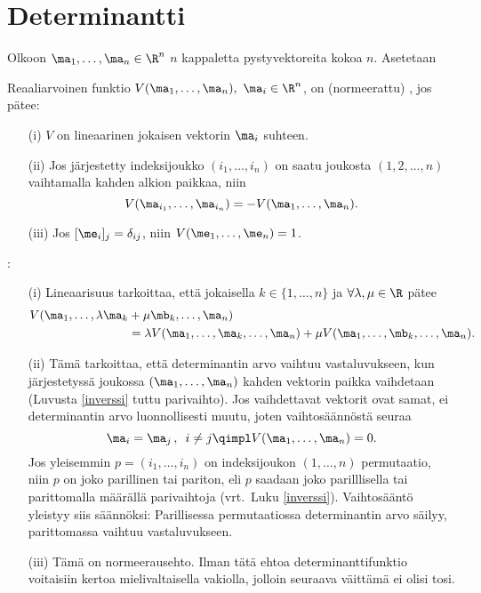 \section{Determinantti} \label{determinantti} 
\alku
{}

Olkoon $\ma_1,\ldots,\ma_n\in\R^n$ $n$ kappaletta pystyvektoreita kokoa $n$. Asetetaan
\begin{Def} \label{determinantin määritelmä} 
Reaaliarvoinen funktio $V(\ma_1,\ldots,\ma_n), \ \ma_i\in\R^n$, on (normeerattu)
, jos pätee:
\begin{itemize}
\item[(i)]   $V$ on lineaarinen jokaisen vektorin $\ma_i$ suhteen.
\item[(ii)]  Jos järjestetty indeksijoukko $(i_1,\ldots,i_n)$ on saatu joukosta $(1,2,\ldots,n)$
             vaihtamalla kahden alkion paikkaa, niin
             \[
             V(\ma_{i_1},\ldots,\ma_{i_n})=-V(\ma_1,\ldots,\ma_n).
             \]
\item[(iii)] Jos $[\me_i]_j=\delta_{ij}$, niin $V(\me_1,\ldots,\me_n)=1$.
\end{itemize}
\end{Def}
:
\begin{itemize}
\item[(i)]   Lineaarisuus tarkoittaa, että jokaisella 
             $k\in\{1,\ldots,n\}$ ja $\forall\lambda,\mu\in\R$ pätee
             \begin{align*}
             V(\ma_1,\ldots,\lambda\ma_k &+ \mu\mb_k,\ldots,\ma_n)\\
             &=\lambda V(\ma_1,\ldots,\ma_k,\ldots,\ma_n)
              +\mu V(\ma_1,\ldots,\mb_k,\ldots,\ma_n).
             \end{align*}
\item[(ii)]  %
             Tämä  tarkoittaa, että determinantin arvo vaihtuu vastaluvukseen,
             kun järjestetyssä joukossa $(\ma_1,\ldots,\ma_n)$ kahden vektorin paikka 
             vaihdetaan (Luvusta \ref{inverssi} tuttu parivaihto). Jos vaihdettavat vektorit
             ovat samat, ei determinantin arvo luonnollisesti muutu, joten vaihtosäännöstä
             seuraa 
             \[
             \ma_i=\ma_j\,,\,\ i \neq j \qimpl V(\ma_1,\ldots,\ma_n)=0.
             \]
             Jos yleisemmin $p=(i_1,\ldots,i_n)$ on indeksijoukon $(1,\ldots,n)$ permutaatio,
             niin $p$ on joko parillinen tai pariton, eli $p$ saadaan joko parilllisella tai
             parittomalla määrällä parivaihtoja (vrt.\ Luku \ref{inverssi}). Vaihtosääntö
             yleistyy siis säännöksi: Parillisessa permutaatiossa determinantin arvo säilyy,
             parittomassa vaihtuu vastaluvukseen.
\item[(iii)] Tämä on normeerausehto. Ilman tätä ehtoa determinanttifunktio voitaisiin kertoa
             mielivaltaisella vakiolla, jolloin seuraava väittämä ei olisi tosi.
\end{itemize}
